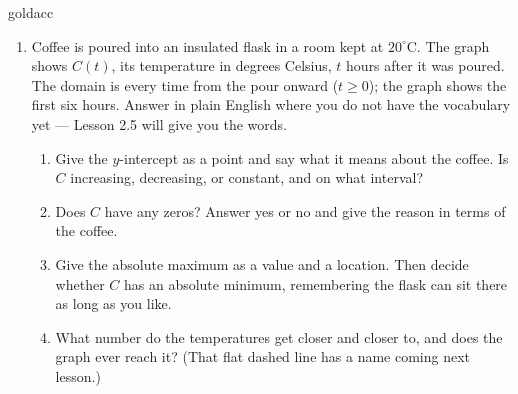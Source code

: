 \documentclass[10pt]{article}
\begin{document}
\vspace{0.10in}

\boxguard[24]
\begin{scenariobox}{goldacc}
\small
\begin{enumerate}[leftmargin=1.6em, itemsep=6pt, topsep=2pt, start=10]

\item Coffee is poured into an insulated flask in a room kept at $20^\circ$C. The graph shows
$C(t)$, its temperature in degrees Celsius, $t$ hours after it was poured. The domain is every time
from the pour onward ($t \ge 0$); the graph shows the first six hours. Answer in plain English where
you do not have the vocabulary yet --- Lesson 2.5 will give you the words.

\begin{center}
\end{center}

\begin{enumerate}[label=(\alph*), leftmargin=1.6em, itemsep=5pt, topsep=4pt]
  \item Give the $y$-intercept as a point and say what it means about the coffee. Is $C$ increasing,
        decreasing, or constant, and on what interval?


  \item Does $C$ have any zeros? Answer yes or no and give the reason in terms of the coffee.


  \item Give the absolute maximum as a value and a location. Then decide whether $C$ has an absolute
        minimum, remembering the flask can sit there as long as you like.


  \item What number do the temperatures get closer and closer to, and does the graph ever reach it?
        (That flat dashed line has a name coming next lesson.)

\end{enumerate}

\end{enumerate}
\end{scenariobox}
\end{document}
